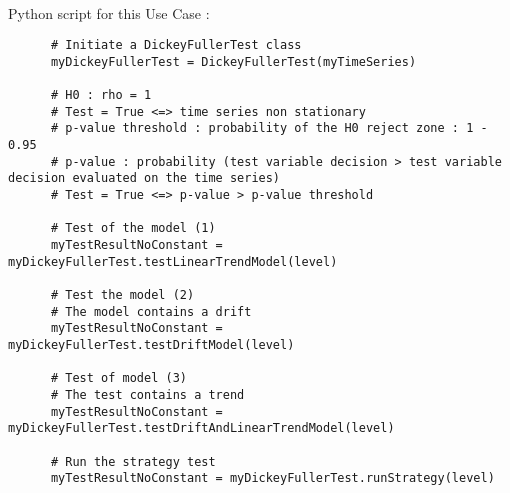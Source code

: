     \textspace\\
    Python script for this Use Case :

    \begin{lstlisting}
      # Initiate a DickeyFullerTest class
      myDickeyFullerTest = DickeyFullerTest(myTimeSeries)

      # H0 : rho = 1
      # Test = True <=> time series non stationary
      # p-value threshold : probability of the H0 reject zone : 1 - 0.95
      # p-value : probability (test variable decision > test variable decision evaluated on the time series)
      # Test = True <=> p-value > p-value threshold

      # Test of the model (1)
      myTestResultNoConstant = myDickeyFullerTest.testLinearTrendModel(level)

      # Test the model (2)
      # The model contains a drift
      myTestResultNoConstant = myDickeyFullerTest.testDriftModel(level)

      # Test of model (3)
      # The test contains a trend
      myTestResultNoConstant = myDickeyFullerTest.testDriftAndLinearTrendModel(level)

      # Run the strategy test
      myTestResultNoConstant = myDickeyFullerTest.runStrategy(level)

    \end{lstlisting}
